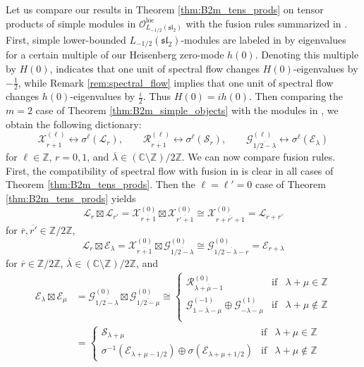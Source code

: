 \documentclass[11pt, reqno]{amsart}
\theoremstyle{definition}\newtheorem{defi}[thm]{Definition}
\theoremstyle{definition}\newtheorem{rem}[thm]{Remark}
\theoremstyle{definition}\newtheorem{exam}[thm]{Example}
\theoremstyle{definition}\newtheorem{assum}[thm]{Assumption}
\newcommand{\cE}{\mathcal{E}}
\newcommand{\cR}{\mathcal{R}}
\newcommand{\cS}{\mathcal{S}}
\newcommand{\cX}{\mathcal{X}}
\newcommand{\cL}{\mathcal{L}}
\newcommand{\cO}{\mathcal{O}}
\newcommand{\cG}{\mathcal{G}}
\newcommand{\CC}{\mathbb{C}}
\newcommand{\ZZ}{\mathbb{Z}}
\newcommand{\tens}{\boxtimes}
\newcommand{\Oloc}{\cO^{\mathrm{loc}}}
\begin{document}
Let us compare our results in Theorem \ref{thm:B2m_tens_prods} on tensor products of simple modules in $\Oloc_{L_{-1/2}(\mathfrak{sl}_2)}$ with the fusion rules summarized in \cite[Section 2.3]{CR1}. First, simple lower-bounded $L_{-1/2}(\mathfrak{sl}_2)$-modules are labeled in \cite{CR1} by eigenvalues for a certain multiple of our Heisenberg zero-mode $h(0)$. Denoting this multiple by $H(0)$, \cite[Figure 1]{CR1} indicates that one unit of spectral flow changes $H(0)$-eigenvalues by $-\frac{1}{2}$, while Remark \ref{rem:spectral_flow} implies that one unit of spectral flow changes $h(0)$-eigenvalues by $\frac{i}{2}$. Thus $H(0)=ih(0)$. Then comparing the $m=2$ case of Theorem \ref{thm:B2m_simple_objects} with the modules in \cite{CR1}, we obtain the following dictionary:
\begin{equation*}
\cX_{\overline{r+1}}^{(\ell)}\longleftrightarrow\sigma^\ell(\cL_{r}),\qquad\cR_{\overline{r+1}}^{(\ell)}\longleftrightarrow\sigma^\ell(\cS_{r}),\qquad \cG^{(\ell)}_{\overline{1/2-\lambda}}\longleftrightarrow \sigma^\ell(\cE_\lambda)
\end{equation*}
for $\ell\in\ZZ$, $r=0,1$, and $\overline{\lambda}\in(\CC\setminus\ZZ)/2\ZZ$. We can now compare fusion rules. First, the compatibility of spectral flow with fusion in \cite[Equation 2.10]{CR1} is clear in all cases of Theorem \ref{thm:B2m_tens_prods}. Then the $\ell=\ell'=0$ case of Theorem \ref{thm:B2m_tens_prods} yields
\begin{equation*}
\cL_r\tens\cL_{r'} =\cX_{\overline{r+1}}^{(0)}\tens\cX_{\overline{r'+1}}^{(0)}\cong\cX_{\overline{r+r'+1}}^{(0)} =\cL_{r+r'}
\end{equation*}
for $\overline{r},\overline{r'}\in\ZZ/2\ZZ$,
\begin{equation*}
\cL_r\tens\cE_\lambda = \cX_{\overline{r+1}}^{(0)}\tens\cG_{\overline{1/2-\lambda}}^{(0)}\cong\cG^{(0)}_{\overline{1/2-\lambda-r}} = \cE_{r+\lambda}
\end{equation*}
for $\overline{r}\in\ZZ/2\ZZ$, $\overline{\lambda}\in(\CC\setminus\ZZ)/2\ZZ$, and
\begin{align*}
\cE_\lambda\tens\cE_\mu & =\cG^{(0)}_{\overline{1/2-\lambda}}\tens\cG^{(0)}_{\overline{1/2-\mu}}\cong\left\lbrace\begin{array}{lll}
\cR_{\overline{\lambda+\mu-1}}^{(0)} & \text{if} & \lambda+\mu\in\ZZ\\
 \cG_{\overline{1-\lambda-\mu}}^{(-1)}\oplus\cG_{\overline{-\lambda-\mu}}^{(1)} & \text{if} & \lambda+\mu\notin\ZZ\\
\end{array}\right.\nonumber\\
& = \left\lbrace\begin{array}{lll}
\cS_{\lambda+\mu} & \text{if} & \lambda+\mu\in\ZZ\\
\sigma^{-1}(\cE_{\lambda+\mu-1/2})\oplus \sigma(\cE_{\lambda+\mu+1/2}) & \text{if} & \lambda+\mu\notin\ZZ
\end{array}\right. 
\end{align*}
\end{document}
